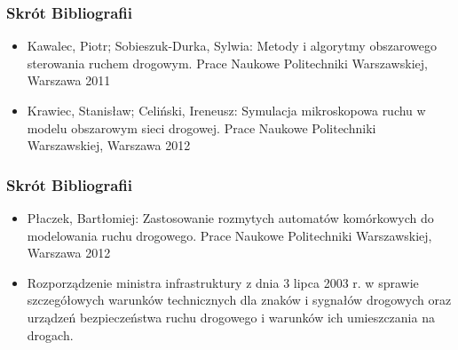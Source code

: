 \documentclass[17pt]{beamer}
\begin{document}
\begin{frame}[shrink=5]
 \frametitle{\vspace{22px}Skrót Bibliografii}
 {\small
 \begin{itemize}
  \item{Kawalec, Piotr; Sobieszuk-Durka, Sylwia: Metody i algorytmy obszarowego sterowania ruchem drogowym. Prace Naukowe Politechniki Warszawskiej, Warszawa 2011}
  \item{Krawiec, Stanisław; Celiński, Ireneusz: Symulacja mikroskopowa ruchu w modelu obszarowym sieci drogowej. Prace Naukowe Politechniki Warszawskiej, Warszawa 2012}
 \end{itemize}
 }
\end{frame}

\begin{frame}[shrink=5]
 \frametitle{\vspace{22px}Skrót Bibliografii}
 {\small
 \begin{itemize}
  \item{Płaczek, Bartłomiej: Zastosowanie rozmytych automatów komórkowych do modelowania ruchu drogowego. Prace Naukowe Politechniki Warszawskiej, Warszawa 2012}
  \item{Rozporządzenie ministra infrastruktury z dnia 3 lipca 2003 r. w sprawie szczegółowych warunków technicznych
 dla znaków i sygnałów drogowych oraz urządzeń bezpieczeństwa ruchu drogowego i warunków ich umieszczania na drogach.}
 \end{itemize}
 }
\end{frame}
\end{document}
